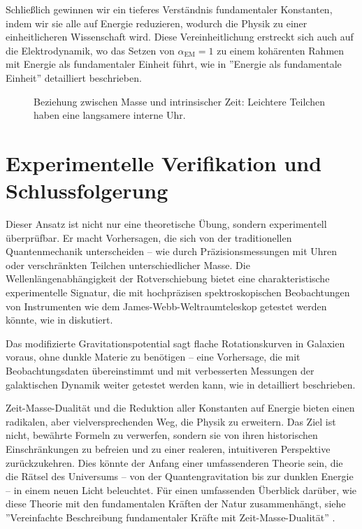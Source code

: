\documentclass[a4paper,12pt]{article}
\newcommand{\Tfield}{T(x)}
\newcommand{\alphaEM}{\alpha_{\text{EM}}}
\begin{document}
	Schließlich gewinnen wir ein tieferes Verständnis fundamentaler Konstanten, indem wir sie alle auf Energie reduzieren, wodurch die Physik zu einer einheitlicheren Wissenschaft wird. Diese Vereinheitlichung erstreckt sich auch auf die Elektrodynamik, wo das Setzen von \(\alphaEM = 1\) zu einem kohärenten Rahmen mit Energie als fundamentaler Einheit führt, wie in ''Energie als fundamentale Einheit'' \cite{pascher_alpha_2025} detailliert beschrieben.
	
	\begin{figure}[h]
		\centering
		\caption{Beziehung zwischen Masse und intrinsischer Zeit: Leichtere Teilchen haben eine langsamere interne Uhr.}
	\end{figure}
	
	\section{Experimentelle Verifikation und Schlussfolgerung}
	
	Dieser Ansatz ist nicht nur eine theoretische Übung, sondern experimentell überprüfbar. Er macht Vorhersagen, die sich von der traditionellen Quantenmechanik unterscheiden – wie durch Präzisionsmessungen mit Uhren oder verschränkten Teilchen unterschiedlicher Masse. Die Wellenlängenabhängigkeit der Rotverschiebung bietet eine charakteristische experimentelle Signatur, die mit hochpräzisen spektroskopischen Beobachtungen von Instrumenten wie dem James-Webb-Weltraumteleskop getestet werden könnte, wie in \cite{pascher_messdifferenzen_2025} diskutiert.
	
	Das modifizierte Gravitationspotential sagt flache Rotationskurven in Galaxien voraus, ohne dunkle Materie zu benötigen – eine Vorhersage, die mit Beobachtungsdaten übereinstimmt und mit verbesserten Messungen der galaktischen Dynamik weiter getestet werden kann, wie in \cite{pascher_galaxies_2025} detailliert beschrieben.
	
	Zeit-Masse-Dualität und die Reduktion aller Konstanten auf Energie bieten einen radikalen, aber vielversprechenden Weg, die Physik zu erweitern. Das Ziel ist nicht, bewährte Formeln zu verwerfen, sondern sie von ihren historischen Einschränkungen zu befreien und zu einer realeren, intuitiveren Perspektive zurückzukehren. Dies könnte der Anfang einer umfassenderen Theorie sein, die die Rätsel des Universums – von der Quantengravitation bis zur dunklen Energie – in einem neuen Licht beleuchtet. Für einen umfassenden Überblick darüber, wie diese Theorie mit den fundamentalen Kräften der Natur zusammenhängt, siehe ''Vereinfachte Beschreibung fundamentaler Kräfte mit Zeit-Masse-Dualität'' \cite{pascher_grundkraefte_2025}.
	
\end{document}
